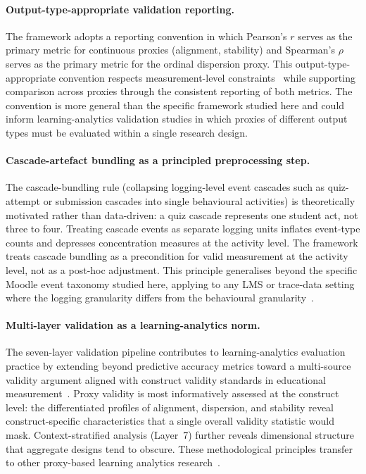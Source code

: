 \documentclass[preprint,12pt,authoryear]{elsarticle}
\begin{document}
\paragraph{Output-type-appropriate validation reporting.}
The framework adopts a reporting convention in which Pearson's $r$ serves as the primary metric for continuous proxies (alignment, stability) and Spearman's $\rho$ serves as the primary metric for the ordinal dispersion proxy. This output-type-appropriate convention respects measurement-level constraints~\citep{messick1995, kane2013} while supporting comparison across proxies through the consistent reporting of both metrics. The convention is more general than the specific framework studied here and could inform learning-analytics validation studies in which proxies of different output types must be evaluated within a single research design.

\paragraph{Cascade-artefact bundling as a principled preprocessing step.}
The cascade-bundling rule (collapsing logging-level event cascades such as quiz-attempt or submission cascades into single behavioural activities) is theoretically motivated rather than data-driven: a quiz cascade represents one student act, not three to four. Treating cascade events as separate logging units inflates event-type counts and depresses concentration measures at the activity level. The framework treats cascade bundling as a precondition for valid measurement at the activity level, not as a post-hoc adjustment. This principle generalises beyond the specific Moodle event taxonomy studied here, applying to any LMS or trace-data setting where the logging granularity differs from the behavioural granularity~\citep{kovanovic2015, rotelli2023, reimann2009}.

\paragraph{Multi-layer validation as a learning-analytics norm.}
The seven-layer validation pipeline contributes to learning-analytics evaluation practice by extending beyond predictive accuracy metrics toward a multi-source validity argument aligned with construct validity standards in educational measurement~\citep{winne2020, jovanovic2021}. Proxy validity is most informatively assessed at the construct level: the differentiated profiles of alignment, dispersion, and stability reveal construct-specific characteristics that a single overall validity statistic would mask. Context-stratified analysis (Layer~7) further reveals dimensional structure that aggregate designs tend to obscure. These methodological principles transfer to other proxy-based learning analytics research~\citep{lockyer2013, khosravi2021, khosravi2022}.
\end{document}

